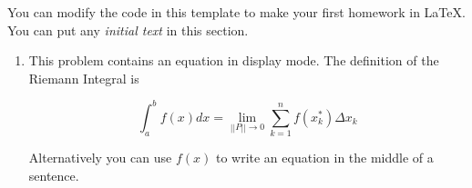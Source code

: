 \documentclass[11pt]{article}
\begin{document}

\noindent
You can modify the code in this template to make your first homework in LaTeX. You can put any \textit{initial text} in this section.


\begin{enumerate}[start=1,label={\bfseries Question \arabic*:},leftmargin=1in] %
    \item This problem contains an equation in display mode. The definition of the Riemann Integral is

    \[ \int_a^bf(x)dx=\lim_{||P||\rightarrow 0}\sum_{k=1}^nf(x_k^*)\Delta x_k\]

    Alternatively you can use $f(x)$ to write an equation in the middle of a sentence.
\end{enumerate}
\end{document}
